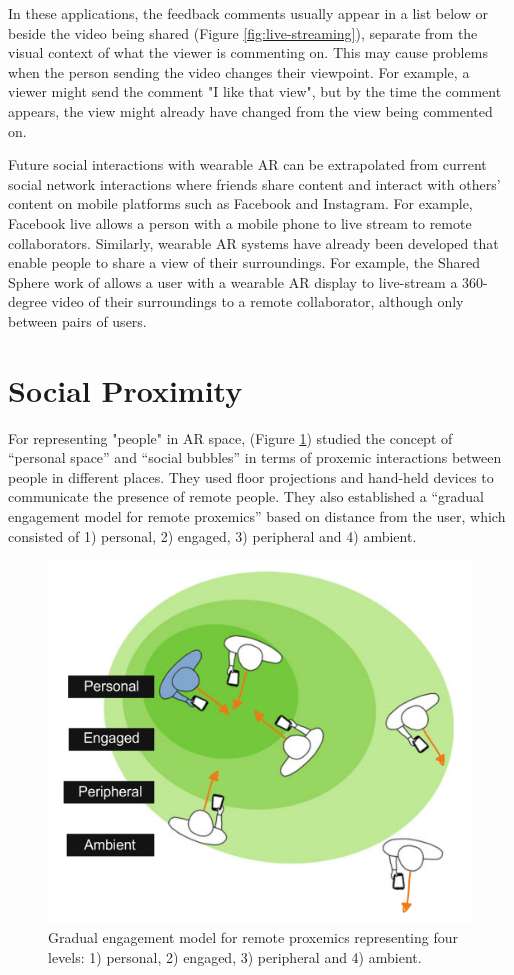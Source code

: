 In these applications, the feedback comments usually appear in a list below or beside the video being shared (Figure \ref{fig:live-streaming}), separate from the visual context of what the viewer is commenting on. This may cause problems when the person sending the video changes their viewpoint. For example, a viewer might send the comment "I like that view", but by the time the comment appears, the view might already have changed from the view being commented on.

Future social interactions with wearable AR can be extrapolated from current social network interactions where friends share content and interact with others' content on mobile platforms such as Facebook and Instagram. For example, Facebook live allows a person with a mobile phone to live stream to remote collaborators. Similarly, wearable AR systems have already been developed that enable people to share a view of their surroundings. For example, the Shared Sphere work of \textcite{lee2017mixed} allows a user with a wearable AR display to live-stream a 360-degree video of their surroundings to a remote collaborator, although only between pairs of users. 

\section{Social Proximity}

For representing "people" in AR space, \textcite{Sousa2016} (Figure \ref{fig:Sousa2016}) studied the concept of \enquote{personal space} and \enquote{social bubbles} in terms of proxemic interactions between people in different places. They used floor projections and hand-held devices to communicate the presence of remote people. They also established a \enquote{gradual engagement model for remote proxemics} based on distance from the user, which consisted of 1) personal, 2) engaged, 3) peripheral and 4) ambient.

\begin{figure}
    \centering
    \includegraphics[width=0.8\linewidth]{images/Sousa2016.PNG}
    \caption{Gradual engagement model for remote proxemics representing four levels: 1) personal, 2) engaged, 3) peripheral and 4) ambient. \cite{Sousa2016}}
    \label{fig:Sousa2016}
\end{figure}

